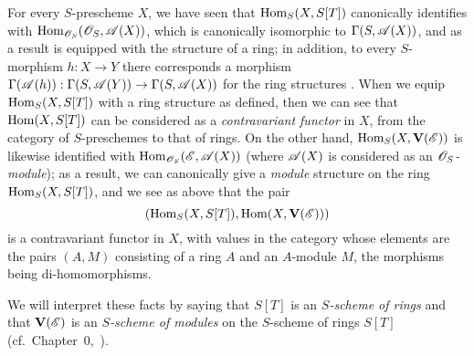 \begin{env}[1.7.13]
\label{II.1.7.13}
For every $S$-prescheme $X$, we have seen  that $\operatorname{Hom}_S(X,S[T])$ canonically identifies with $\operatorname{Hom}_{\mathscr{O}_S}(\mathscr{O}_S,\mathscr{A}(X))$, which is canonically isomorphic to $\Gamma(S,\mathscr{A}(X))$, and as a result is equipped with the structure of a ring; in addition, to every $S$-morphism $h:X\to Y$ there corresponds a morphism $\Gamma(\sh{A}(h)):\Gamma(S,\sh{A}(Y))\to\Gamma(S,\sh{A}(X))$ for the ring structures .
When we equip $\operatorname{Hom}_S(X,S[T])$ with a ring structure as defined, then we can see that $\operatorname{Hom}(X,S[T])$ can be considered as a \emph{contravariant functor} in $X$, from the category of $S$-preschemes to that of rings.
On the other hand, $\operatorname{Hom}_S(X,\mathbf{V}(\mathscr{E}))$ is likewise identified with $\operatorname{Hom}_{\mathscr{O}_S}(\mathscr{E},\mathscr{A}(X))$ (where $\mathscr{A}(X)$ is considered as an \emph{$\mathscr{O}_S$-module}); as a result, we can canonically give a \emph{module} structure on the ring $\operatorname{Hom}_S(X,S[T])$, and we see as above that the pair
\[
  (\operatorname{Hom}_S(X,S[T]),\operatorname{Hom}(X,\mathbf{V}(\mathscr{E})))
\]
is a contravariant functor in $X$, with values in the category whose elements are the pairs $(A,M)$ consisting of a ring $A$ and an $A$-module $M$, the morphisms being di-homomorphisms.

We will interpret these facts by saying that $S[T]$ is an \emph{$S$-scheme of rings} and that $\mathbf{V}(\mathscr{E})$ is an \emph{$S$-scheme of modules} on the $S$-scheme of rings $S[T]$ (cf.~Chapter~0,~).
\end{env}

